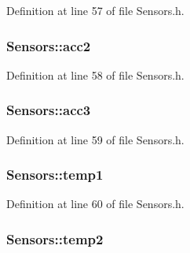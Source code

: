 Definition at line 57 of file Sensors.\+h.

\subsubsection[{\texorpdfstring{acc2}{acc2}}]{ Sensors\+::acc2\hspace{0.3cm}{\ttfamily [private]}}\hypertarget{class_sensors_a9170ea284aa665a822ec2cf8fc9fefdf}{}\label{class_sensors_a9170ea284aa665a822ec2cf8fc9fefdf}


Definition at line 58 of file Sensors.\+h.

\subsubsection[{\texorpdfstring{acc3}{acc3}}]{ Sensors\+::acc3\hspace{0.3cm}{\ttfamily [private]}}\hypertarget{class_sensors_afd2385d76c20609170ace022a945edfa}{}\label{class_sensors_afd2385d76c20609170ace022a945edfa}


Definition at line 59 of file Sensors.\+h.

\subsubsection[{\texorpdfstring{temp1}{temp1}}]{ Sensors\+::temp1\hspace{0.3cm}{\ttfamily [private]}}\hypertarget{class_sensors_abf16d9fc6440651f552d24d91090cb7f}{}\label{class_sensors_abf16d9fc6440651f552d24d91090cb7f}


Definition at line 60 of file Sensors.\+h.

\subsubsection[{\texorpdfstring{temp2}{temp2}}]{ Sensors\+::temp2\hspace{0.3cm}{\ttfamily [private]}}\hypertarget{class_sensors_a3ef4e3befd4b22c61900ee9b589511f0}{}\label{class_sensors_a3ef4e3befd4b22c61900ee9b589511f0}



